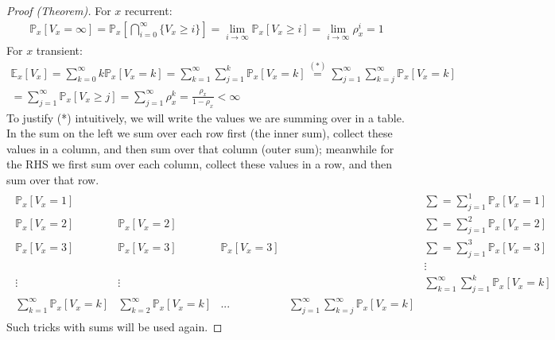 \documentclass[12pt]{book}
\theoremstyle{definition}
\theoremstyle{remark}
\begin{document}
\begin{proof}[Proof (Theorem)]
	For $x$ recurrent: 
	\begin{gather}
		\mathbb{P}_{x} \left[ V_x = \infty \right] = \mathbb{P}_{x} \left[ \bigcap_{i=0}^{\infty} \{V_x \geq i\} \right] = \lim_{i\to \infty} \mathbb{P}_{x} \left[ V_x \geq i \right] = \lim_{i \to \infty} \rho_x^{i} = 1 
	\end{gather}
	For $x$ transient:
	\begin{gather}
		\mathbb{E}_{x} \left[ V_x \right] = \sum_{k=0}^{\infty} k \mathbb{P}_{x} \left[ V_x = k \right] = \sum_{k=1}^{\infty} \sum_{j=1}^{k} \mathbb{P}_{x} \left[ V_x=k \right] \stackrel{(*)}{=} \sum_{j=1}^{\infty} \sum_{k=j}^{\infty} \mathbb{P}_{x} \left[ V_x=k \right] \\
		= \sum_{j=1}^{\infty} \mathbb{P}_{x} \left[ V_x \geq j \right] = \sum_{j=1}^{\infty} \rho_x^k = \frac{\rho_x}{1-\rho_x} < \infty
	\end{gather}
	To justify (*) intuitively, we will write the values we are summing over in a table. In the sum on the left we sum over each row first (the inner sum), collect these values in a column, and then sum over that column (outer sum); meanwhile for the RHS we first sum over each column, collect these values in a row, and then sum over that row.	
	\begin{gather*}
	\begin{matrix}
	\mathbb{P}_{x} \left[ V_x = 1 \right] & & & & \sum=\sum_{j=1}^{1} \mathbb{P}_{x} \left[ V_x =1 \right]  \\
	\mathbb{P}_{x} \left[ V_x = 2 \right] & \mathbb{P}_{x} \left[ V_x =2 \right] & & & \sum = \sum_{j=1}^{2} \mathbb{P}_{x} \left[ V_x = 2 \right]  \\
	\mathbb{P}_{x} \left[ V_x = 3 \right] & \mathbb{P}_{x} \left[ V_x =3 \right] &  \mathbb{P}_{x} \left[ V_x=3 \right] & & \sum = \sum_{j=1}^{3} \mathbb{P}_{x} \left[ V_x =3 \right]  \\
	& & & & \vdots \\ 
	\vdots & \vdots & & & \sum_{k=1}^{\infty} \sum_{j=1}^{k} \mathbb{P}_{x} \left[ V_x = k \right] \\
	\sum_{k=1}^{\infty} \mathbb{P}_{x} \left[ V_x =k \right] & \sum_{k=2}^{\infty} \mathbb{P}_{x} \left[ V_x=k \right]  &  ...  & \sum_{j=1}^{\infty} \sum_{k=j}^{\infty} \mathbb{P}_{x} \left[ V_x = k \right]  
	\end{matrix}
	\end{gather*}
	Such tricks with sums will be used again.
\end{proof}
\end{document}
